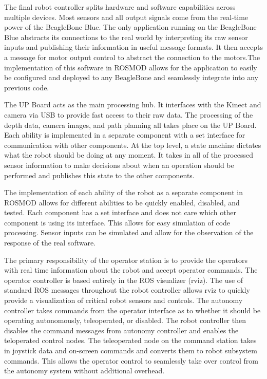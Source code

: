 \documentclass[class=article, crop=false]{standalone}
\begin{document}
	The final robot controller splits hardware and software capabilities across multiple devices. Most sensors and all output signals come from the real-time power of the BeagleBone Blue. The only application running on the BeagleBone Blue abstracts its connections to the real world by interpreting its raw sensor inputs and publishing their information in useful message formats. It then accepts a message for motor output control to abstract the connection to the motors.The implementation of this software in ROSMOD allows for the application to easily be configured and deployed to any BeagleBone and seamlessly integrate into any previous code.
	
	The UP Board acts as the main processing hub. It interfaces with the Kinect and camera via USB to provide fast access to their raw data. The processing of the depth data, camera images, and path planning all takes place on the UP Board. Each ability is implemented in a separate component with a set interface for communication with other components. At the top level, a state machine dictates what the robot should be doing at any moment. It takes in all of the processed sensor information to make decisions about when an operation should be performed and publishes this state to the other components.
	
	The implementation of each ability of the robot as a separate component in ROSMOD allows for different abilities to be quickly enabled, disabled, and tested. Each component has a set interface and does not care which other component is using its interface. This allows for easy simulation of code processing. Sensor inputs can be simulated and allow for the observation of the response of the real software.

	
	
	The primary responsibility of the operator station is to provide the operators with real time information about the robot and accept operator commands. The operator controller is based entirely in the ROS visualizer (rviz). The use of standard ROS messages throughout the robot controller allows rviz to quickly provide a visualization of critical robot sensors and controls. The autonomy controller takes commands from the operator interface as to whether it should be operating autonomously, teleoperated, or disabled. The robot controller then disables the command messages from autonomy controller and enables the teloperated control nodes. The teleoperated node on the command station takes in joystick data and on-screen commands and converts them to robot subsystem commands. This allows the operator control to seamlessly take over control from the autonomy system without additional overhead.
	
\end{document}
